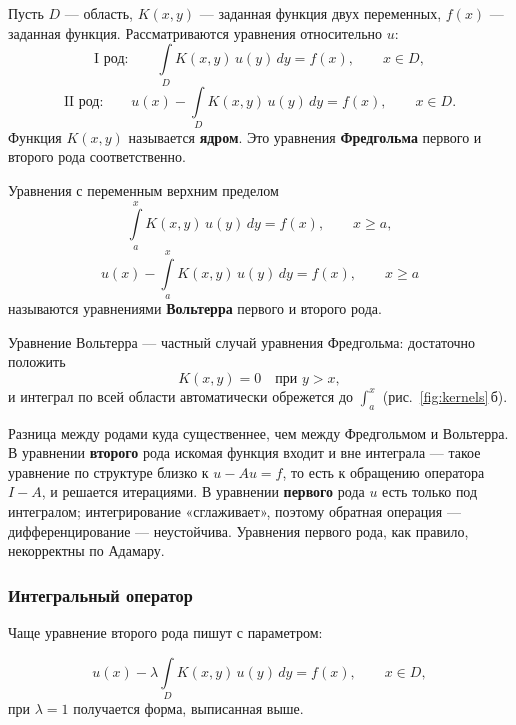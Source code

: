 \begin{example}
Пусть $D$ — область, $K(x,y)$ — заданная функция двух переменных,
$f(x)$ — заданная функция. Рассматриваются уравнения относительно $u$:
\[
  \text{I род:}\qquad
  \int\limits_{D} K(x,y)\, u(y)\, dy = f(x), \qquad x \in D ,
\]
\[
  \text{II род:}\qquad
  u(x) - \int\limits_{D} K(x,y)\, u(y)\, dy = f(x), \qquad x \in D .
\]
Функция $K(x,y)$ называется \textbf{ядром}. Это уравнения
\textbf{Фредгольма} первого и второго рода соответственно.
\end{example}

\begin{definition}
Уравнения с переменным верхним пределом
\[
  \int\limits_{a}^{x} K(x,y)\, u(y)\, dy = f(x), \qquad x \ge a ,
\]
\[
  u(x) - \int\limits_{a}^{x} K(x,y)\, u(y)\, dy = f(x), \qquad x \ge a
\]
называются уравнениями \textbf{Вольтерра} первого и второго рода.
\end{definition}

\begin{remark}
Уравнение Вольтерра — частный случай уравнения Фредгольма: достаточно
положить
\[
  K(x,y) = 0 \quad\text{при } y > x ,
\]
и интеграл по всей области автоматически обрежется до $\int_a^x$
(рис.~\ref{fig:kernels}\,б).
\end{remark}

\begin{idea}
Разница между родами куда существеннее, чем между Фредгольмом и Вольтерра. В
уравнении \textbf{второго} рода искомая функция входит и вне интеграла — такое
уравнение по структуре близко к $u - Au = f$, то есть к обращению оператора
$I - A$, и решается итерациями. В уравнении \textbf{первого} рода $u$ есть
только под интегралом; интегрирование «сглаживает», поэтому обратная операция
— дифференцирование — неустойчива. Уравнения первого рода, как правило,
некорректны по Адамару.
\end{idea}

\subsubsection*{Интегральный оператор}

Чаще уравнение второго рода пишут с параметром:

\begin{equation}\tag{1}\label{eq:fredholm2}
  u(x) - \lambda \int\limits_{D} K(x,y)\, u(y)\, dy = f(x),
  \qquad x \in D ,
\end{equation}
при $\lambda = 1$ получается форма, выписанная выше.

